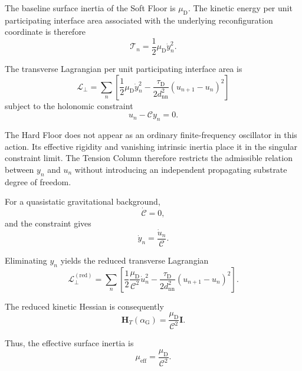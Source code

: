 The baseline surface inertia of the Soft Floor is $\mu_{\mathrm{D}}$. The kinetic energy per unit participating interface area associated with the underlying reconfiguration coordinate is therefore
\begin{equation}
    \mathcal{T}_n = \frac{1}{2} \mu_{\mathrm{D}}\dot{y}_n^2.
\end{equation}

The transverse Lagrangian per unit participating interface area is
\begin{equation}
    \boxed{ \mathscr{L}_{\perp} = \sum_n \left[ \frac{1}{2}\mu_{\mathrm{D}}\dot{y}_n^2 - \frac{\tau_{\mathrm{D}}}{2d_{\mathrm{nn}}^2} \left( u_{n+1}-u_n \right)^2 \right] }
\end{equation}
subject to the holonomic constraint
\begin{equation}
    u_n - \mathcal{C} y_n = 0.
\end{equation}

The Hard Floor does not appear as an ordinary finite-frequency oscillator in this action. Its effective rigidity and vanishing intrinsic inertia place it in the singular constraint limit. The Tension Column therefore restricts the admissible relation between $y_n$ and $u_n$ without introducing an independent propagating substrate degree of freedom.

For a quasistatic gravitational background,
\begin{equation}
    \dot{\mathcal{C}} = 0,
\end{equation}
and the constraint gives
\begin{equation}
    \dot{y}_n = \frac{\dot{u}_n}{\mathcal{C}}.
\end{equation}

Eliminating $y_n$ yields the reduced transverse Lagrangian
\begin{equation}
    \boxed{ \mathscr{L}_{\perp}^{(\mathrm{red})} = \sum_n \left[ \frac{1}{2} \frac{\mu_{\mathrm{D}}}{\mathcal{C}^2} \dot{u}_n^2 - \frac{\tau_{\mathrm{D}}}{2d_{\mathrm{nn}}^2} \left( u_{n+1}-u_n \right)^2 \right] }.
\end{equation}

The reduced kinetic Hessian is consequently
\begin{equation}
    \boxed{ \mathbf{H}_T(\alpha_{\mathrm{G}}) = \frac{\mu_{\mathrm{D}}}{\mathcal{C}^2}\mathbf{I} }.
\end{equation}

Thus, the effective surface inertia is
\begin{equation}
    \boxed{ \mu_{\mathrm{eff}} = \frac{\mu_{\mathrm{D}}}{\mathcal{C}^2} }.
\end{equation}

